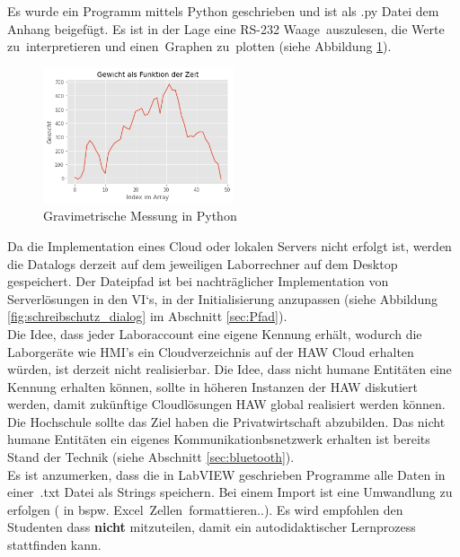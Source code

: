 Es wurde ein Programm mittels Python geschrieben und ist als .py Datei dem Anhang beigefügt. Es ist in der Lage eine RS-232 Waage \,{\Menlo auszulesen}, die Werte zu \,{\Menlo interpretieren} und einen \,{\Menlo Graphen} zu \,{\Menlo plotten} (siehe Abbildung \ref{fig:Gravimetrischemessung_python}). \\

\begin{figure}[h!] %
\centering
\includegraphics[width=0.5\textwidth]{Bilder/Gewicht_als_Funktion_der_zeit.png}
\vspace{0em}
 \caption[Gravimetrische Messung in Python]
{Gravimetrische Messung in Python}\label{fig:Gravimetrischemessung_python}
\end{figure}

Da die Implementation eines Cloud oder lokalen Servers nicht erfolgt ist, werden die Datalogs derzeit auf dem jeweiligen Laborrechner auf dem Desktop gespeichert. Der Dateipfad ist bei nachträglicher Implementation von Serverlösungen in den VI`s, in der Initialisierung anzupassen (siehe Abbildung \ref{fig:schreibschutz_dialog} im Abschnitt \ref{sec:Pfad}).\\

Die Idee, dass jeder Laboraccount eine eigene Kennung erhält, wodurch die Laborgeräte wie HMI's ein Cloudverzeichnis auf der HAW Cloud erhalten würden, ist derzeit nicht realisierbar. Die Idee, dass nicht humane Entitäten eine Kennung erhalten können, sollte in höheren Instanzen der HAW diskutiert werden, damit zukünftige Cloudlösungen HAW global realisiert werden können. Die Hochschule sollte das Ziel haben die Privatwirtschaft abzubilden. Das nicht humane Entitäten ein eigenes Kommunikationbsnetzwerk erhalten ist bereits Stand der Technik (siehe Abschnitt \ref{sec:bluetooth}). \\

Es ist anzumerken, dass die in LabVIEW geschrieben Programme alle Daten in einer \,{\Menlo *.txt} Datei als Strings speichern. Bei einem Import ist eine Umwandlung zu erfolgen ( in bspw. Excel \,{\Menlo Zellen} \,{\Menlo formattieren..}). Es wird empfohlen den Studenten dass \textbf{nicht} mitzuteilen, damit ein autodidaktischer Lernprozess stattfinden kann.





